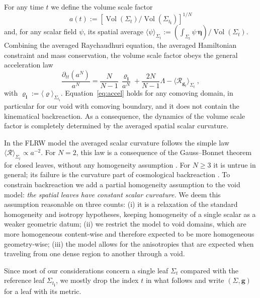 \documentclass[aps,prd,reprint,amsmath,amssymb,nofootinbib,longbibliography]{revtex4-2}
\DeclareMathOperator{\Vol}{Vol}
\newcommand{\g}{\mathbf{g}}                 %
\newcommand{\Rs}{\mathcal{R}}               %
\newcommand{\vol}{\boldsymbol{\eta}}        %
\newcommand{\ini}[1]{{#1}_{\mathbf{i}}}     %
\newcommand{\inirho}{\ini{\varrho}}
\theoremstyle{plain}
\theoremstyle{definition}
\theoremstyle{remark}
\begin{document}
For any time $t$ we define the volume scale factor
\begin{equation*}
a(t) := \left[\Vol(\Sigma_t)/\Vol(\Sigma_{\ini t})\right]^{1/N}
\end{equation*}
and, for any scalar field $\psi$, its spatial average $\langle \psi\rangle_{\Sigma_t} := \left(\int_{\Sigma_t}\psi \,\vol\right)/\Vol(\Sigma_t)$. Combining the averaged Raychaudhuri equation, the averaged Hamiltonian constraint and mass conservation, the volume scale factor obeys the general acceleration law \cite{Buchert_2007,brunswic2020gaussbonnetchern}
\begin{equation}
\label{eq:accel}
\frac{\partial_{tt} (a^N)}{a^N} = \frac{N}{N-1}\, \frac{\inirho}{a^N} + \frac{2N}{N-1}\Lambda - \langle \Rs_{\g_t} \rangle_{\Sigma_t}\ ,
\end{equation}
with $\inirho := \langle\varrho\rangle_{\Sigma_{\ini t}}$. Equation~\eqref{eq:accel} holds for any comoving domain, in particular for our void with comoving boundary, and it does not contain the kinematical backreaction. As a consequence, the dynamics of the volume scale factor is completely determined by the averaged spatial scalar curvature.

In the FLRW model the averaged scalar curvature follows the simple law $\langle \Rs \rangle_{\Sigma_t} \propto a^{-2}$. For $N=2$, this law is a consequence of the Gauss--Bonnet theorem for closed leaves, without any homogeneity assumption \cite{brunswic2020gaussbonnetchern}. For $N\geq3$ it is untrue in general; its failure is the curvature part of cosmological backreaction \cite{Buchert_2007}. To constrain backreaction we add a partial homogeneity assumption to the void model: \emph{the spatial leaves have constant scalar curvature.} We deem this assumption reasonable on three counts: (i) it is a relaxation of the standard homogeneity and isotropy hypotheses, keeping homogeneity of a single scalar as a weaker geometric datum; (ii) we restrict the model to void domains, which are more homogeneous content-wise and therefore expected to be more homogeneous geometry-wise; (iii) the model allows for the anisotropies that are expected when traveling from one dense region to another through a void.

Since most of our considerations concern a single leaf $\Sigma_t$ compared with the reference leaf $\Sigma_{\ini t}$, we mostly drop the index $t$ in what follows and write $(\Sigma,\g)$ for a leaf with its metric.

\end{document}
